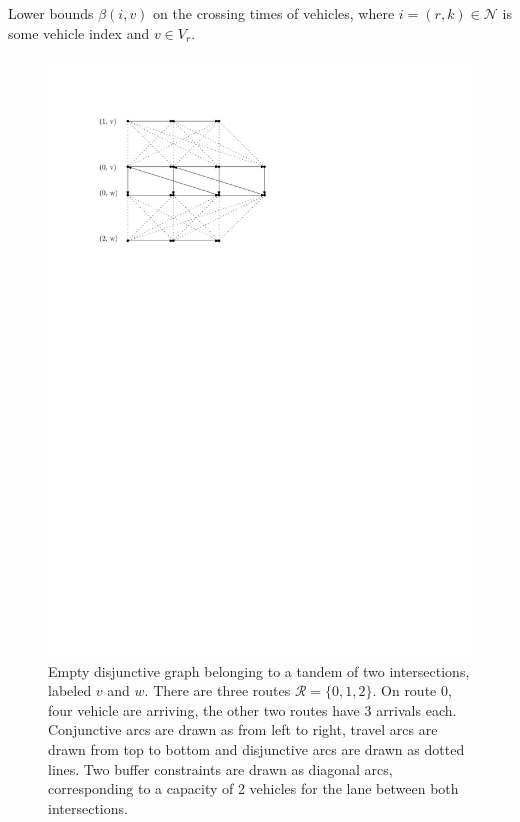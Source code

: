 \documentclass[a4paper]{article}
\theoremstyle{definition}
\theoremstyle{plain}
\begin{document}
Lower bounds $\beta(i, v)$ on the crossing times of vehicles, where
$i = (r, k) \in \mathcal{N}$ is some vehicle index and $v \in V_{r}$.

\begin{figure}
  \centering
  \includegraphics[scale=1]{figures/network/disjunctive_graph}
  \caption{Empty disjunctive graph belonging to a tandem of two intersections,
    labeled $v$ and $w$. There are three routes $\mathcal{R} = \{0, 1, 2\}$. On
    route 0, four vehicle are arriving, the other two routes have 3 arrivals
    each. Conjunctive arcs are drawn as from left to right, travel arcs are
    drawn from top to bottom and disjunctive arcs are drawn as dotted lines. Two
    buffer constraints are drawn as diagonal arcs, corresponding to a capacity
    of 2 vehicles for the lane between both intersections.}
  \label{fig:disjunctive_graph}
\end{figure}
\end{document}
